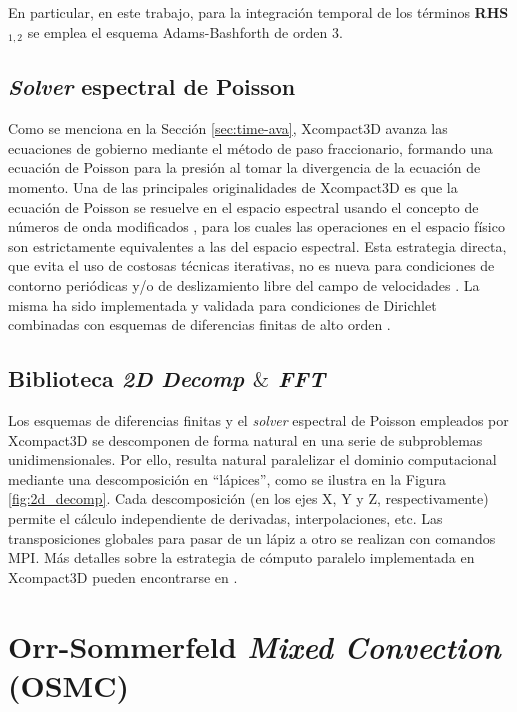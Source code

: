 En particular, en este trabajo, para la integración temporal de los términos \textbf{RHS}$_{1,2}$ se emplea el esquema Adams-Bashforth de orden 3.



\subsection{\textit{Solver} espectral de Poisson}

Como se menciona en la Sección \ref{sec:time-ava}, Xcompact3D avanza las ecuaciones de gobierno mediante el método de paso fraccionario, formando una ecuación de Poisson para la presión al tomar la divergencia de la ecuación de momento. Una de las principales originalidades de Xcompact3D es que la ecuación de Poisson se resuelve en el espacio espectral usando el concepto de números de onda modificados \cite{lele1992compact}, para los cuales las operaciones en el espacio físico son estrictamente equivalentes a las del espacio espectral. Esta estrategia directa, que evita el uso de costosas técnicas iterativas, no es nueva para condiciones de contorno periódicas y/o de deslizamiento libre del campo de velocidades \cite{schumann1976direct}. La misma ha sido implementada y validada para condiciones de Dirichlet combinadas con esquemas de diferencias finitas de alto orden \cite{laizet2009high}.

\subsection{Biblioteca \textit{2D Decomp $\&$ FFT}}

Los esquemas de diferencias finitas y el \textit{solver} espectral de Poisson empleados por \linebreak Xcompact3D se descomponen de forma natural en una serie de subproblemas unidimensionales. Por ello, resulta natural paralelizar el dominio computacional mediante una descomposición en “lápices”, como se ilustra en la Figura \ref{fig:2d_decomp}. Cada descomposición (en los ejes X, Y y Z, respectivamente) permite el cálculo independiente de derivadas, interpolaciones, etc. Las transposiciones globales para pasar de un lápiz a otro se realizan con comandos MPI. Más detalles sobre la estrategia de cómputo paralelo implementada en Xcompact3D pueden \linebreak encontrarse en \cite{laizet2011incompact3d}.



\section{Orr-Sommerfeld \textit{Mixed Convection} (OSMC)}

